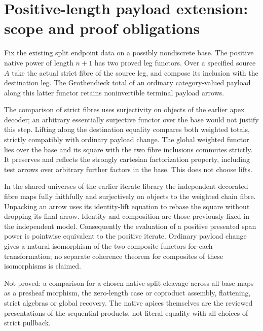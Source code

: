 \documentclass{article}
\begin{document}
\section*{Positive-length payload extension: scope and proof obligations}
Fix the existing split endpoint data on a possibly nondiscrete base. The positive native power of length $n+1$ has two proved leg functors. Over a specified source $A$ take the actual strict fibre of the source leg, and compose its inclusion with the destination leg. The Grothendieck total of an ordinary category-valued payload along this latter functor retains noninvertible terminal payload arrows.
\par The comparison of strict fibres uses surjectivity on objects of the earlier apex decoder; an arbitrary essentially surjective functor over the base would not justify this step. Lifting along the destination equality compares both weighted totals, strictly compatibly with ordinary payload change. The global weighted functor lies over the base and its square with the two fibre inclusions commutes strictly. It preserves and reflects the strongly cartesian factorization property, including test arrows over arbitrary further factors in the base. This does not choose lifts.
\par In the shared universes of the earlier iterate library the independent decorated fibre maps fully faithfully and surjectively on objects to the weighted chain fibre. Unpacking an arrow uses its identity-lift equation to rebase the square without dropping its final arrow. Identity and composition are those previously fixed in the independent model. Consequently the evaluation of a positive presented span power is pointwise equivalent to the positive iterate. Ordinary payload change gives a natural isomorphism of the two composite functors for each transformation; no separate coherence theorem for composites of these isomorphisms is claimed.
\par Not proved: a comparison for a chosen native split cleavage across all base maps as a presheaf morphism, the zero-length case or coproduct assembly, flattening, strict algebras or global recovery. The native apices themselves are the reviewed presentations of the sequential products, not literal equality with all choices of strict pullback.
\end{document}

